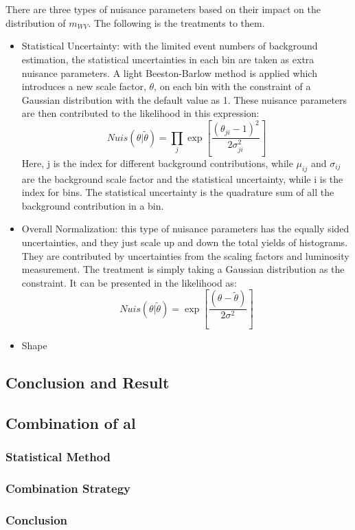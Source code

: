 \\
\\There are three types of nuisance parameters based on their impact on the distribution of $m_{WV}$. The following is the treatments to them.
\begin{itemize}
	\item Statistical Uncertainty: with the limited event numbers of background estimation, the statistical uncertainties in each bin are taken as extra nuisance parameters. A light Beeston-Barlow method is applied which introduces a new scale factor, $\theta$, on each bin with the constraint of a Gaussian distribution with the default value as 1. These nuisance parameters are then contributed to the likelihood in this expression:
	\begin{equation}
	Nuis(\theta|\tilde{\theta}) = \displaystyle\prod_{j}\exp{\left[\frac{(\theta_{ji}-1)^2}{2\sigma^{2}_{ji}}\right]}
	\end{equation} 
    Here, j is the index for different background contributions, while $\mu_{ij}$ and $\sigma_{ij}$ are the background scale factor and the statistical uncertainty, while i is the index for bins. The statistical uncertainty is the quadrature sum of all the background contribution in a bin. 
	\item Overall Normalization: this type of nuisance parameters has the equally sided uncertainties, and they just scale up and down the total yields of histograms. They are contributed by uncertainties from the scaling factors and luminosity measurement. The treatment is simply taking a Gaussian distribution as the constraint. It can be presented in the likelihood as:
	\begin{equation}
	Nuis(\theta|\tilde{\theta})=\exp\left[\frac{(\theta-\tilde{\theta})}{2\sigma^2}\right]
	\end{equation}
	\item Shape
\end{itemize}
\subsection{Conclusion and Result}
\subsection{Combination of al}
\subsubsection{Statistical Method}
\subsubsection{Combination Strategy}
\subsubsection{Conclusion}